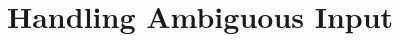 \chapter{Handling Ambiguous Input}

\newcommand{\rk}[1]{{\color{red}#1}}
\newcommand{\MPJPE}{MPJPE\xspace}
\newcommand{\RE}{RE\xspace}
\newcommand{\SE}{SE\xspace}

\ifpdf
    \graphicspath{{Chapter6/Figs/Raster/}{Chapter6/Figs/PDF/}{Chapter6/Figs/}}
\else
    \graphicspath{{Chapter6/Figs/Vector/}{Chapter6/Figs/}}
\fi





